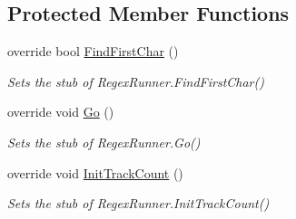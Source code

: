 \subsection*{Protected Member Functions}
\begin{DoxyCompactItemize}
\item 
override bool \hyperlink{class_system_1_1_text_1_1_regular_expressions_1_1_fakes_1_1_stub_regex_runner_aed5aad68be644394b672ce6e0016ac0f}{Find\-First\-Char} ()
\begin{DoxyCompactList}\small\item\em Sets the stub of Regex\-Runner.\-Find\-First\-Char()\end{DoxyCompactList}\item 
override void \hyperlink{class_system_1_1_text_1_1_regular_expressions_1_1_fakes_1_1_stub_regex_runner_a47ef88a1e85c8e288fd6ade0339ede28}{Go} ()
\begin{DoxyCompactList}\small\item\em Sets the stub of Regex\-Runner.\-Go()\end{DoxyCompactList}\item 
override void \hyperlink{class_system_1_1_text_1_1_regular_expressions_1_1_fakes_1_1_stub_regex_runner_a5fb29460bcff5e430bb2fae4aa127b88}{Init\-Track\-Count} ()
\begin{DoxyCompactList}\small\item\em Sets the stub of Regex\-Runner.\-Init\-Track\-Count()\end{DoxyCompactList}\end{DoxyCompactItemize}
